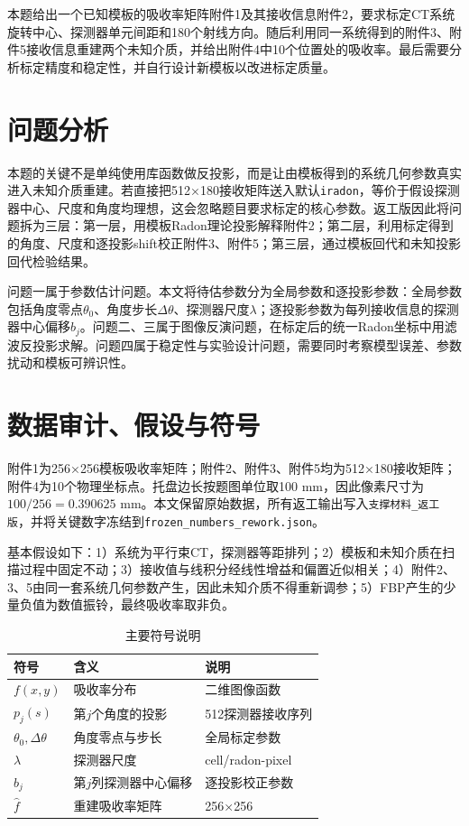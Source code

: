 \documentclass[UTF8,a4paper,12pt]{ctexart}
\begin{document}
本题给出一个已知模板的吸收率矩阵附件1及其接收信息附件2，要求标定CT系统旋转中心、探测器单元间距和180个射线方向。随后利用同一系统得到的附件3、附件5接收信息重建两个未知介质，并给出附件4中10个位置处的吸收率。最后需要分析标定精度和稳定性，并自行设计新模板以改进标定质量。

\section{问题分析}
本题的关键不是单纯使用库函数做反投影，而是让由模板得到的系统几何参数真实进入未知介质重建。若直接把512×180接收矩阵送入默认\texttt{iradon}，等价于假设探测器中心、尺度和角度均理想，这会忽略题目要求标定的核心参数。返工版因此将问题拆为三层：第一层，用模板Radon理论投影解释附件2；第二层，利用标定得到的角度、尺度和逐投影shift校正附件3、附件5；第三层，通过模板回代和未知投影回代检验结果。

问题一属于参数估计问题。本文将待估参数分为全局参数和逐投影参数：全局参数包括角度零点\(\theta_0\)、角度步长\(\Delta\theta\)、探测器尺度\(\lambda\)；逐投影参数为每列接收信息的探测器中心偏移\(b_j\)。问题二、三属于图像反演问题，在标定后的统一Radon坐标中用滤波反投影求解。问题四属于稳定性与实验设计问题，需要同时考察模型误差、参数扰动和模板可辨识性。

\section{数据审计、假设与符号}
附件1为256×256模板吸收率矩阵；附件2、附件3、附件5均为512×180接收矩阵；附件4为10个物理坐标点。托盘边长按题图单位取100 mm，因此像素尺寸为\(100/256=0.390625\) mm。本文保留原始数据，所有返工输出写入\texttt{支撑材料\_返工版}，并将关键数字冻结到\texttt{frozen\_numbers\_rework.json}。

基本假设如下：1）系统为平行束CT，探测器等距排列；2）模板和未知介质在扫描过程中固定不动；3）接收值与线积分经线性增益和偏置近似相关；4）附件2、3、5由同一套系统几何参数产生，因此未知介质不得重新调参；5）FBP产生的少量负值为数值振铃，最终吸收率取非负。

\begin{table}[H]\centering\caption{主要符号说明}\begin{tabular}{lll}\toprule
符号&含义&说明\\\midrule
\(f(x,y)\)&吸收率分布&二维图像函数\\
\(p_j(s)\)&第\(j\)个角度的投影&512探测器接收序列\\
\(\theta_0,\Delta\theta\)&角度零点与步长&全局标定参数\\
\(\lambda\)&探测器尺度&cell/radon-pixel\\
\(b_j\)&第\(j\)列探测器中心偏移&逐投影校正参数\\
\(\hat f\)&重建吸收率矩阵&256×256\\\bottomrule
\end{tabular}\end{table}
\end{document}
